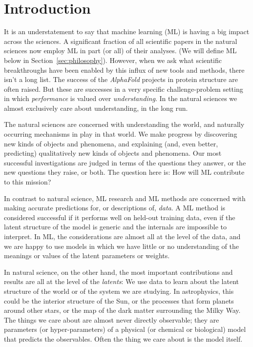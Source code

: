 \documentclass{article}
\newcommand{\sectionname}{Section}
\newcommand{\secref}[1]{\sectionname~\ref{#1}}
\begin{document}
\section{Introduction}\label{sec:intro}
It is an understatement to say that machine learning (ML) is having a big impact across the sciences.
A significant fraction of all scientific papers in the natural sciences now employ ML in part (or all) of their analyses.
(We will define ML below in \secref{sec:philosophy}).
However, when we ask what scientific breakthroughs have been enabled by this influx of new tools and methods, there isn't a long list.
The success of the \textsl{AlphaFold} projects in protein structure \cite{alphafold} are often raised.
But these are successes in a very specific challenge-problem setting in which \emph{performance} is valued over \emph{understanding}.
In the natural sciences we almost exclusively care about understanding, in the long run.

The natural sciences are concerned with understanding the world, and naturally occurring mechanisms in play in that world.
We make progress by discovering new kinds of objects and phenomena, and explaining (and, even better, predicting) qualitatively new kinds of objects and phenomena.
Our most successful investigations are judged in terms of the questions they answer, or the new questions they raise, or both.
The question here is: How will ML contribute to this mission?

In contrast to natural science, ML research and ML methods are concerned with making accurate predictions for, or descriptions of, \emph{data}.
A ML method is considered successful if it performs well on held-out training data, even if the latent structure of the model is generic and the internals are impossible to interpret.
In ML, the considerations are almost all at the level of the data, and we are happy to use models in which we have little or no understanding of the meanings or values of the latent parameters or weights.

In natural science, on the other hand, the most important contributions and results are all at the level of the \emph{latents}:
We use data to learn about the latent structure of the world or of the system we are studying.
In astrophysics, this could be the interior structure of the Sun, or the processes that form planets around other stars, or the map of the dark matter surrounding the Milky Way.
The things we care about are almost never directly observable; they are parameters (or hyper-parameters) of a physical (or chemical or biological) model that predicts the observables.
Often the thing we care about is the model itself.
\end{document}
